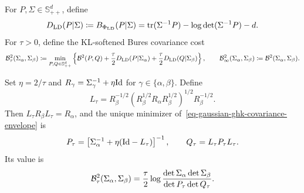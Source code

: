 \begin{defn}\label{def-gaussian-soft-bures}
For $P,\Sigma\in\mathbb S_{++}^d$, define
\begin{equation}\label{eq-logdet-divergence-gaussian-uot}
D_{\mathrm{LD}}(P|\Sigma)
\coloneqq
B_{\Phi_{\mathrm{LD}}}(P|\Sigma)
=
\operatorname{tr}(\Sigma^{-1}P)-\log\det(\Sigma^{-1}P)-d.
\end{equation}
For $\tau>0$, define the KL-softened Bures covariance cost
\begin{equation}\label{eq-gaussian-ghk-covariance-envelope}
\mathcal{B}_\tau^2(\Sigma_\alpha,\Sigma_\beta)
\coloneqq
\min_{P,Q\in\mathbb S_{++}^d}
\left\{
\mathcal{B}^2(P,Q)
+\frac{\tau}{2}D_{\mathrm{LD}}(P|\Sigma_\alpha)
+\frac{\tau}{2}D_{\mathrm{LD}}(Q|\Sigma_\beta)
\right\},
\qquad
\mathcal{B}_\infty^2(\Sigma_\alpha,\Sigma_\beta)
\coloneqq
\mathcal{B}^2(\Sigma_\alpha,\Sigma_\beta).
\end{equation}
\end{defn}
\begin{prop}\label{prop-gaussian-ghk-adjusted-covariances}
Set $\eta=2/\tau$ and $R_\gamma=\Sigma_\gamma^{-1}+\eta\mathrm{Id}$ for $\gamma\in\{\alpha,\beta\}$. Define
\begin{equation}\label{eq-gaussian-ghk-adjusted-map}
L_\tau
=
R_\beta^{-1/2}
\left(R_\beta^{1/2}R_\alpha R_\beta^{1/2}\right)^{1/2}
R_\beta^{-1/2}.
\end{equation}
Then $L_\tau R_\beta L_\tau=R_\alpha$, and the unique minimizer of~\eqref{eq-gaussian-ghk-covariance-envelope} is
\begin{equation}\label{eq-gaussian-ghk-adjusted-covariances}
P_\tau=\left[\Sigma_\alpha^{-1}+\eta(\mathrm{Id}-L_\tau)\right]^{-1},
\qquad
Q_\tau=L_\tau P_\tau L_\tau.
\end{equation}
Its value is
\begin{equation}\label{eq-gaussian-ghk-covariance-value}
\mathcal{B}_\tau^2(\Sigma_\alpha,\Sigma_\beta)
=
\frac{\tau}{2}
\log\frac{\det\Sigma_\alpha\det\Sigma_\beta}
{\det P_\tau\det Q_\tau}.
\end{equation}
\end{prop}
